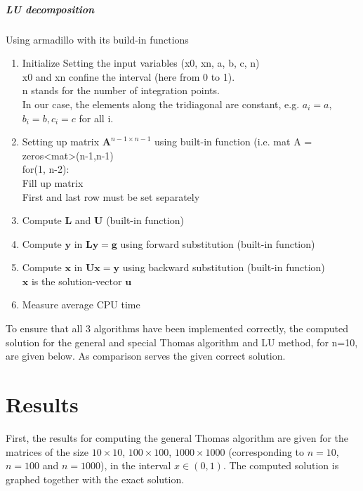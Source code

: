 \documentclass[%
oneside,                 %
final,                   %
10pt]{article}
\begin{document}
\subparagraph{LU decomposition}
Using armadillo with its build-in functions
\begin{enumerate}
\item Initialize Setting the input variables (x0, xn, a, b, c, n) \\
	x0 and xn confine the interval (here from 0 to 1). \\
	n stands for the number of integration points. \\
	In our case, the elements along the tridiagonal are constant, e.g. $a_i=a$, $b_i=b, c_i=c$ for all i. 

\item Setting up matrix $\mathbf{A}^{n-1 \times n-1}$ using built-in function (i.e. mat A = zeros<mat>(n-1,n-1)\\
	 for(1, n-2): \\
	 Fill up matrix \\
	 First and last row must be set separately
		
\item Compute $\mathbf{L}$ and $\mathbf{U}$ (built-in function)

\item Compute $\mathbf{y}$ in $\mathbf{Ly}=\mathbf{g}$ using forward substitution (built-in function)

\item Compute $\mathbf{x}$ in $\mathbf{Ux}=\mathbf{y}$ using backward substitution (built-in function)\\
		$\mathbf{x}$ is the solution-vector $\mathbf{u}$ 

\item Measure average CPU time		
\end{enumerate}
To ensure that all 3 algorithms have been implemented correctly, the computed solution for the general and special Thomas algorithm and LU method, for n=10, are given below. As comparison serves the given correct solution.

\section*{Results}
First, the results for computing the general Thomas algorithm are given for the matrices of the size $10 \times 10$, $100 \times 100$, $1000 \times 1000$ (corresponding to $n=10$, $n=100$ and $n=1000$), in the interval $x \in (0,1)$. The computed solution is graphed together with the exact solution.
\end{document}
